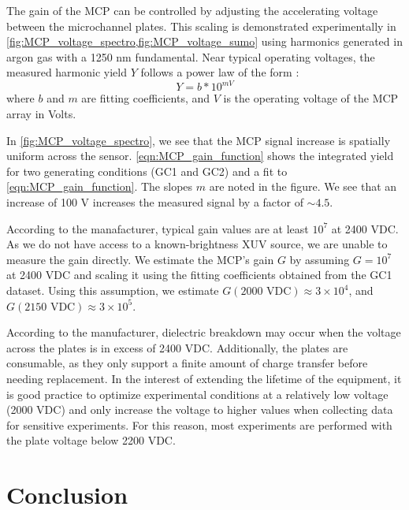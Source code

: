 The gain of the MCP can be controlled by adjusting the accelerating voltage between the microchannel plates. This scaling is demonstrated experimentally in \cref{fig:MCP_voltage_spectro,fig:MCP_voltage_sumo} using harmonics generated in argon gas with a 1250 nm fundamental. Near typical operating voltages, the measured harmonic yield $Y$ follows a power law of the form \cite{fraserGrayImagingUsing1984,ladislaswizaMicrochannelPlateDetectors1979a}:
\begin{equation}
Y = b * 10^{m V}
\label{eqn:MCP_gain_function}
\end{equation}
where $b$ and $m$ are fitting coefficients, and $V$ is the operating voltage of the MCP array in Volts.

In \cref{fig:MCP_voltage_spectro}, we see that the MCP signal increase is spatially uniform across the sensor. \cref{eqn:MCP_gain_function} shows the integrated yield for two generating conditions (GC1 and GC2) and a fit to \cref{eqn:MCP_gain_function}. The slopes $m$ are noted in the figure. We see that an increase of 100 V increases the measured signal by a factor of $\sim 4.5$.

According to the manafacturer, typical gain values are at least $10^7$ at 2400 VDC. As we do not have access to a known-brightness XUV source, we are unable to measure the gain directly. We estimate the MCP's gain $G$ by assuming $G = 10^7$ at 2400 VDC and scaling it using the fitting coefficients obtained from the GC1 dataset. Using this assumption, we estimate $G(\textrm{2000 VDC}) \approx 3 \times 10^4$, and $G(\textrm{2150 VDC}) \approx 3 \times 10^5$.

According to the manufacturer, dielectric breakdown may occur when the voltage across the plates is in excess of 2400 VDC. Additionally, the plates are consumable, as they only support a finite amount of charge transfer before needing replacement. In the interest of extending the lifetime of the equipment, it is good practice to optimize experimental conditions at a relatively low voltage (2000 VDC) and only increase the voltage to higher values when collecting data for sensitive experiments. For this reason, most experiments are performed with the plate voltage below 2200 VDC.


\section{Conclusion}

